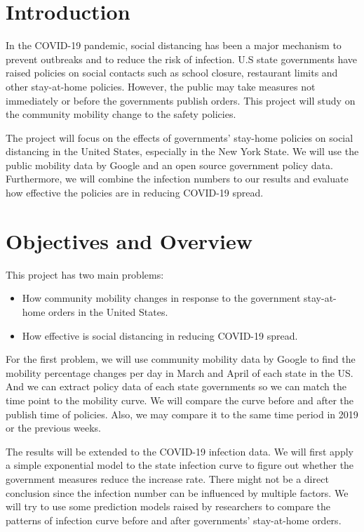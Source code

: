 \documentclass[a4paper,12pt]{article}
\begin{document}
\begin{spacing}{1.3}
\newpage


\section{Introduction}

In the COVID-19 pandemic, social distancing has been a major mechanism to prevent outbreaks and to reduce the risk of infection. U.S state governments have raised policies on social contacts such as school closure, restaurant limits and other stay-at-home policies. However, the public may take measures not immediately or before the governments publish orders. This project will study on the community mobility change to the safety policies.

The project will focus on the effects of governments' stay-home policies on social distancing in the United States, especially in the New York State. We will use the public mobility data by Google and an open source government policy data. Furthermore, we will combine the infection numbers to our results and evaluate how effective the policies are in reducing COVID-19 spread.


\section{Objectives and Overview}

This project has two main problems:

\begin{itemize}
	\item How community mobility changes in response to the government stay-at-home orders in the United States.
	\item How effective is social distancing in reducing COVID-19 spread.
\end{itemize}

For the first problem, we will use community mobility data by Google to find the mobility percentage changes per day in March and April of each state in the US. And we can extract policy data of each state governments so we can match the time point to the mobility curve. We will compare the curve before and after the publish time of policies. Also, we may compare it to the same time period in 2019 or the previous weeks.

The results will be extended to the COVID-19 infection data. We will first apply a simple exponential model to the state infection curve to figure out whether the government measures reduce the increase rate. There might not be a direct conclusion since the infection number can be influenced by multiple factors. We will try to use some prediction models raised by researchers to compare the patterns of infection curve before and after governments' stay-at-home orders.




\end{spacing}
\end{document}
